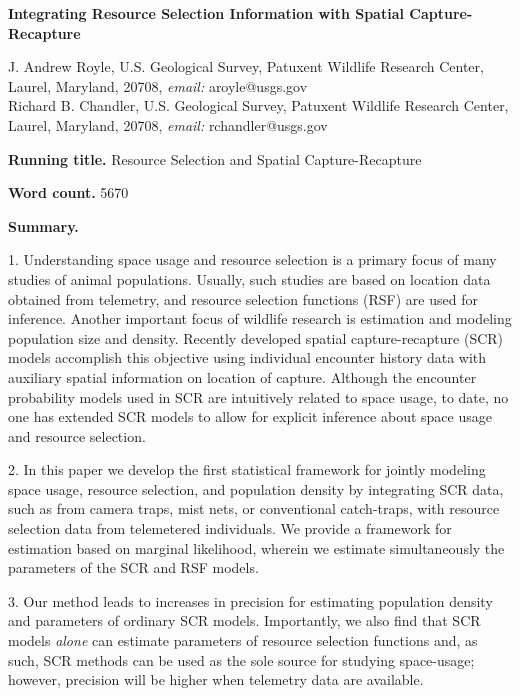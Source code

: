 \documentclass[12pt]{article}
\begin{document}
\begin{center}
\Large \textbf{
Integrating
Resource Selection Information with Spatial Capture-Recapture
}
\end{center}
%


\noindent J. Andrew Royle, U.S. Geological Survey, Patuxent
Wildlife Research Center, Laurel, Maryland, 20708,
\emph{email:} aroyle@usgs.gov \\

\noindent Richard B. Chandler,  U.S. Geological Survey, Patuxent
Wildlife Research Center, Laurel, Maryland, 20708,
\emph{email:} rchandler@usgs.gov \\

\vspace{.2in}

{\bf Running title.} Resource Selection and Spatial Capture-Recapture

\vspace{.2in}

{\bf Word count.} 5670

\vspace{.2in}

{\bf Summary.}

1.
Understanding space usage and resource selection is a primary focus of
many studies of animal populations. Usually, such studies are based on
location data obtained from telemetry,
and resource selection functions (RSF) are used for inference.
Another important focus of wildlife research is estimation and
modeling population size and density.
Recently developed spatial capture-recapture (SCR) models accomplish this objective
using individual encounter history data with auxiliary spatial information
on location of capture. Although the encounter probability models used in SCR
are intuitively related to space usage, to date, no one has extended
SCR models to allow for explicit inference about
space usage and resource selection.

2. In this paper we develop the first statistical framework for
jointly modeling space usage, resource selection, and population
density by integrating SCR data, such as from camera traps, mist nets, or
conventional catch-traps, with resource selection data from telemetered individuals.
We provide a framework for estimation based on marginal
likelihood, wherein we estimate simultaneously the parameters of the
SCR and RSF models.

3.
Our method leads to increases in precision
for estimating %
population density and parameters of ordinary
SCR models.  Importantly, we also find that SCR models {\it alone} can
estimate parameters of resource selection functions and, as such, SCR
methods can be used as the sole source for studying space-usage;
however, precision will be higher when telemetry data are available.
\end{document}
